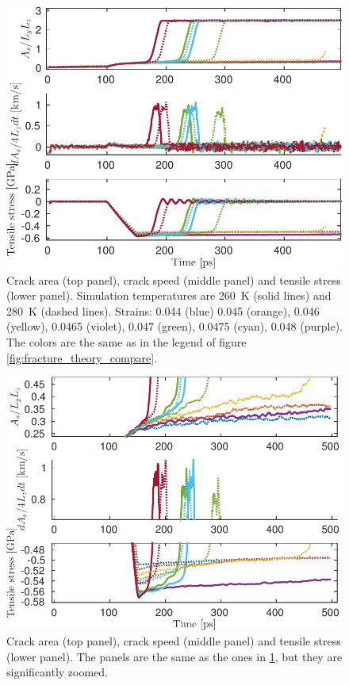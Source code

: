 \begin{figure}
\centering
\includegraphics[width=12cm]{../figures/thesis/area_speed_stress_all.pdf}
\caption{Crack area (top panel), crack speed (middle panel) and tensile stress (lower panel). Simulation temperatures are \SI{260}{\kelvin} (solid lines) and \SI{280}{\kelvin} (dashed lines). Strains: 0.044 (blue) 0.045 (orange), 0.046 (yellow), 0.0465 (violet), 0.047 (green), 0.0475 (cyan), 0.048 (purple). The colors are the same as in the legend of figure \ref{fig:fracture_theory_compare}. }
\label{fig:area_speed_stress_all}
\end{figure}

\begin{figure}
\centering
\includegraphics[width=12cm]{../figures/thesis/area_speed_stress_all_zoomed.pdf}
\caption{Crack area (top panel), crack speed (middle panel) and tensile stress (lower panel). The panels are the same as the ones in \ref{fig:area_speed_stress_all}, but they are significantly zoomed.}
\end{figure}

